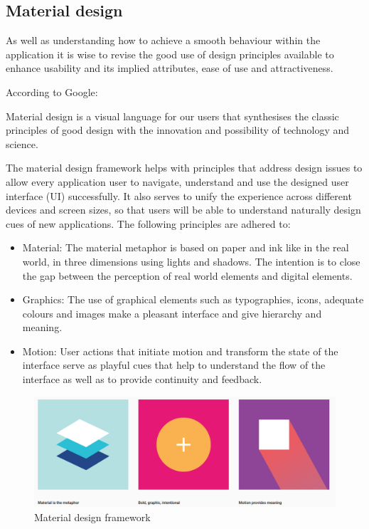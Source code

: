 \subsection{Material design}
As well as understanding how to achieve a smooth behaviour within the application it is wise to revise the good use of design principles available to enhance usability and its implied attributes, ease of use and attractiveness.

According to Google: \begin{displayquote}Material design is a visual language for our users that synthesises the classic principles of good design with the innovation and possibility of technology and science. \end{displayquote} 

The material design framework helps with principles that address design issues to allow every application user to navigate, understand and use the designed user interface (UI) successfully. It also serves to unify the experience across different devices and screen sizes, so that users will be able to understand naturally design cues of new applications. The following principles are adhered to: 

\begin{itemize}
    \item Material: The material metaphor is based on paper and ink like in the real world, in three dimensions using lights and shadows. The intention is to close the gap between the perception of real world elements and digital elements. 
    \item Graphics: The use of graphical elements such as typographies, icons, adequate colours and images make a pleasant interface and give hierarchy and meaning. 
    \item Motion: User actions that initiate motion and transform the state of the interface serve as playful cues that help to understand the flow of the interface as well as to provide continuity and feedback. 
\end{itemize}


\begin{figure}[H]
\begin{adjustbox}{width=1\textwidth,center=\textwidth}
  \centering
  \includegraphics[scale=1]{images/material_google.png}
\end{adjustbox}
  \caption[Material design framework]{Material design framework \footnotemark}
  \label{fig:android_material_design}
\end{figure}

